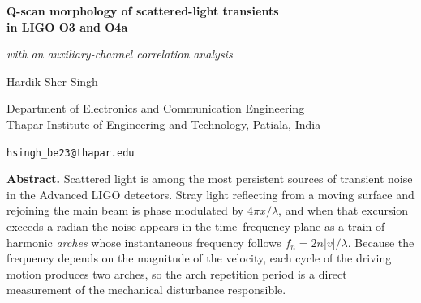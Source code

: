 \begin{titlepage}
\centering

\ifresultspending
\vspace*{0.4cm}
\vspace{1.0cm}
\else
\vspace*{2.0cm}
\fi

{\Large\bfseries
Q-scan morphology of scattered-light transients\\[0.35em]
in LIGO O3 and O4a\par}

\vspace{0.9em}
{\large\itshape with an auxiliary-channel correlation analysis\par}

\vspace{2.4cm}
{\large Hardik Sher Singh\par}
\vspace{0.4em}
{\normalsize Department of Electronics and Communication Engineering\\
Thapar Institute of Engineering and Technology, Patiala, India\par}
\vspace{0.3em}
{\small\texttt{hsingh\_be23@thapar.edu}\par}

\vspace{2.8cm}
\begin{minipage}{0.85\textwidth}
\small
\noindent\textbf{Abstract.}
Scattered light is among the most persistent sources of transient noise in the
Advanced LIGO detectors. Stray light reflecting from a moving surface and
rejoining the main beam is phase modulated by $4\pi x/\lambda$, and when that
excursion exceeds a radian the noise appears in the time--frequency plane as a
train of harmonic \emph{arches} whose instantaneous frequency follows
$f_n = 2n|v|/\lambda$. Because the frequency depends on the magnitude of the
velocity, each cycle of the driving motion produces two arches, so the arch
repetition period is a direct measurement of the mechanical disturbance
responsible.


\end{minipage}
\end{titlepage}
